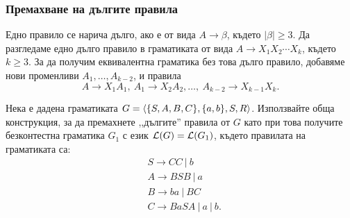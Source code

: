 \subsubsection*{Премахване на дългите правила}

Едно правило се нарича дълго, ако е от вида $A \to \beta$, където $|\beta| \geq 3$.
Да разгледаме едно дълго правило в граматиката от вида $A \to X_1X_2\cdots X_k$, където $k \geq 3$.
За да получим еквивалентна граматика без това дълго правило,
добавяме нови променливи $A_1,\dots, A_{k-2}$, и правила
\[A \to X_1A_1,\ A_1 \to X_2A_2, \dots,\ A_{k-2} \to X_{k-1}X_k.\]

\begin{problem}
  Нека е дадена граматиката  $G = \langle{\{S,A,B,C\}, \{a,b\}, S, R}\rangle$.
  Използвайте обща конструкция, за да премахнете ,,дългите'' правила от $ G$ като при това получите 
  безконтестна граматика $G_1$ с език $\mathcal{L}(G) = \mathcal{L}(G_1)$, където правилата на граматиката са:
    \begin{align*}
      & S\to CC\ |\ b\\
      & A\to BSB\ |\ a\\
      & B\to ba\ |\ BC\\
      & C\to BaSA\ |\ a\ |\ b.
    \end{align*}
\end{problem}

